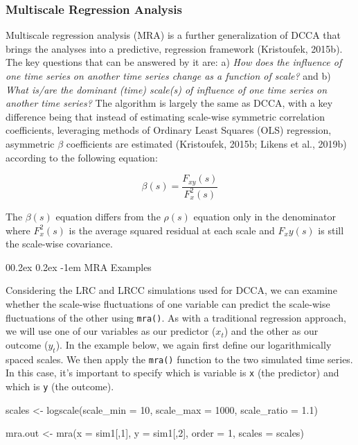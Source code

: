 \documentclass[
  man]{apa6}
\makeatletter
\newenvironment{Shaded}{\begin{snugshade}}{\end{snugshade}}
\newcommand{\AttributeTok}[1]{\textcolor[rgb]{0.77,0.63,0.00}{#1}}
\newcommand{\DecValTok}[1]{\textcolor[rgb]{0.00,0.00,0.81}{#1}}
\newcommand{\FloatTok}[1]{\textcolor[rgb]{0.00,0.00,0.81}{#1}}
\newcommand{\FunctionTok}[1]{\textcolor[rgb]{0.00,0.00,0.00}{#1}}
\newcommand{\NormalTok}[1]{#1}
\newcommand{\OtherTok}[1]{\textcolor[rgb]{0.56,0.35,0.01}{#1}}
\let\oldparagraph\paragraph
\renewcommand{\paragraph}[1]{\oldparagraph{#1}\mbox{}}
\renewcommand{\paragraph}{\@startsection{paragraph}{4}{\parindent}%
  {0\baselineskip \@plus 0.2ex \@minus 0.2ex}%
  {-1em}%
  {\normalfont\normalsize\bfseries\itshape\typesectitle}}
\makeatother
\begin{document}
\hypertarget{multiscale-regression-analysis}{%
\subsubsection{Multiscale Regression Analysis}\label{multiscale-regression-analysis}}

Multiscale regression analysis (MRA) is a further generalization of DCCA
that brings the analyses into a predictive, regression framework
(Kristoufek, 2015b). The key questions that can be answered by it are: a)
\emph{How does the influence of one time series on another time series change
as a function of scale?} and b) \emph{What is/are the dominant (time)
scale(s) of influence of one time series on another time series?} The
algorithm is largely the same as DCCA, with a key difference being that
instead of estimating scale-wise symmetric correlation coefficients,
leveraging methods of Ordinary Least Squares (OLS) regression,
asymmetric \(\beta\) coefficients are estimated (Kristoufek, 2015b; Likens et al., 2019b) according to the following equation:

\[
\beta(s)=\frac{F_{xy}(s)}{F^2_x(s)}
\]

The \(\beta(s)\) equation differs from the \(\rho(s)\) equation only in the
denominator where \(F^2_x(s)\) is the average squared residual at each
scale and \(F_xy(s)\) is still the scale-wise covariance.

\hypertarget{mra-examples}{%
\paragraph{MRA Examples}\label{mra-examples}}

Considering the LRC and LRCC simulations used for DCCA, we can examine
whether the scale-wise fluctuations of one variable can predict the
scale-wise fluctuations of the other using \texttt{mra()}. As with a
traditional regression approach, we will use one of our variables as our
predictor (\(x_t\)) and the other as our outcome (\(y_t\)). In the example
below, we again first define our logarithmically spaced scales. We then
apply the \texttt{mra()} function to the two simulated time series. In this
case, it's important to specify which is variable is \texttt{x} (the predictor)
and which is \texttt{y} (the outcome).

\begin{Shaded}
\begin{Highlighting}[]
\NormalTok{scales }\OtherTok{\textless{}{-}} \FunctionTok{logscale}\NormalTok{(}\AttributeTok{scale\_min =} \DecValTok{10}\NormalTok{, }\AttributeTok{scale\_max =} \DecValTok{1000}\NormalTok{, }\AttributeTok{scale\_ratio =} \FloatTok{1.1}\NormalTok{)}

\NormalTok{mra.out }\OtherTok{\textless{}{-}} \FunctionTok{mra}\NormalTok{(}\AttributeTok{x =}\NormalTok{ sim1[,}\DecValTok{1}\NormalTok{], }\AttributeTok{y =}\NormalTok{ sim1[,}\DecValTok{2}\NormalTok{], }\AttributeTok{order =} \DecValTok{1}\NormalTok{, }\AttributeTok{scales =}\NormalTok{ scales)}
\end{Highlighting}
\end{Shaded}
\end{document}
